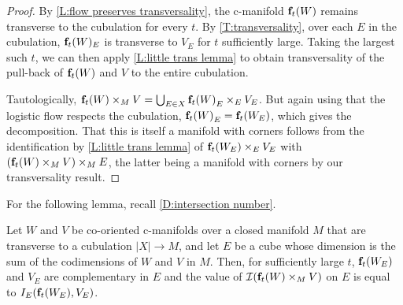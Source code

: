 \begin{proof}
	By \cref{L:flow preserves transversality}, the c-manifold $\mathbf{f}_t(W)$ remains transverse to the cubulation for every $t$.
	By \cref{T:transversality}, over each $E$ in the cubulation, $\mathbf{f}_t(W)_E$ is transverse to $V_E$ for $t$ sufficiently large.
	Taking the largest
	such $t$, we can then apply \cref{L:little trans lemma} to obtain transversality of the pull-back of $\mathbf{f}_t(W)$ and $V$ to the entire cubulation.

	Tautologically, $ \mathbf{f}_t(W) \times_M V = \bigcup_{E \in X} {\mathbf{f}_t(W)}_E \times_E V_E$.
	But again using that the logistic flow respects the cubulation, ${\mathbf{f}_t(W)}_E = {\mathbf{f}_t(W_E)}$, which gives the decomposition.
	That this is itself a manifold with corners follows from the identification by \cref{L:little trans lemma} of $ {\mathbf{f}_t(W_E)} \times_E V_E$ with $(\mathbf{f}_t(W) \times_M V)\times_M E$, the latter being a manifold with corners by our transversality result.
\end{proof}

For the following lemma, recall \cref{D:intersection number}.

\begin{lemma}\label{L:intersection signs}
	Let $W$ and $V$ be co-oriented c-manifolds over a closed manifold $M$ that are transverse to a cubulation $|X| \to M$, and let $E$ be a cube whose dimension
	is the sum of the codimensions of $W$ and $V$ in $M$.
	Then, for sufficiently large $t$, $\mathbf{f}_t(W_E)$ and $V_E$ are complementary in $E$ and the value of $\mathcal{I}(\mathbf{f}_t(W) \times_M V)$ on $E$
	is equal to $I_E(\mathbf{f}_t(W_E), V_E)$.
\end{lemma}

